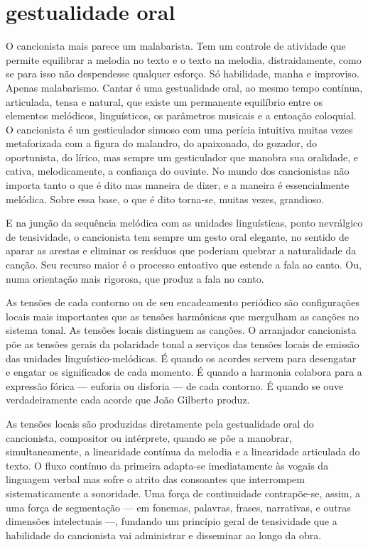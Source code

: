 \section{gestualidade oral}

O cancionista mais parece um malabarista. Tem um controle de atividade
que permite equilibrar a melodia no texto e o texto na melodia,
distraidamente, como se para isso não despendesse qualquer esforço. Só
habilidade, manha e improviso. Apenas malabarismo. Cantar é uma
gestualidade oral, ao mesmo tempo contínua, articulada, tensa e natural,
que existe um permanente equilíbrio entre os elementos melódicos,
linguísticos, os parâmetros musicais e a entoação coloquial. O
cancionista é um gesticulador sinuoso com uma perícia intuitiva muitas
vezes metaforizada com a figura do malandro, do apaixonado, do gozador,
do oportunista, do lírico, mas sempre um gesticulador que manobra sua
oralidade, e cativa, melodicamente, a confiança do ouvinte. No mundo dos
cancionistas não importa tanto o que é dito mas maneira de dizer, e a
maneira é essencialmente melódica. Sobre essa base, o que é dito
torna-se, muitas vezes, grandioso.

E na junção da sequência melódica com as unidades linguísticas, ponto
nevrálgico de tensividade, o cancionista tem sempre um gesto oral
elegante, no sentido de aparar as arestas e eliminar os resíduos que
poderiam quebrar a naturalidade da canção. Seu recurso maior é o
processo entoativo que estende a fala ao canto. Ou, numa orientação mais
rigorosa, que produz a fala no canto.

As tensões de cada contorno ou de seu encadeamento periódico são
configurações locais mais importantes que as tensões harmônicas que
mergulham as canções no sistema tonal. As tensões locais distinguem as
canções. O arranjador cancionista põe as tensões gerais da polaridade
tonal a serviços das tensões locais de emissão das unidades
linguístico-melódicas. É quando os acordes servem para desengatar e
engatar os significados de cada momento. É quando a harmonia colabora
para a expressão fórica --- euforia ou disforia --- de cada contorno. É quando
se ouve verdadeiramente cada acorde que João Gilberto produz.

As tensões locais são produzidas diretamente pela gestualidade oral do
cancionista, compositor ou intérprete, quando se põe a manobrar,
simultaneamente, a linearidade contínua da melodia e a linearidade
articulada do texto. O fluxo contínuo da primeira adapta-se
imediatamente às vogais da linguagem verbal mas sofre o atrito das
consoantes que interrompem sistematicamente a sonoridade. Uma força de
continuidade contrapõe-se, assim, a uma força de segmentação --- em
fonemas, palavras, frases, narrativas, e outras dimensões intelectuais ---,
fundando um princípio geral de tensividade que a habilidade do
cancionista vai administrar e disseminar ao longo da obra.

